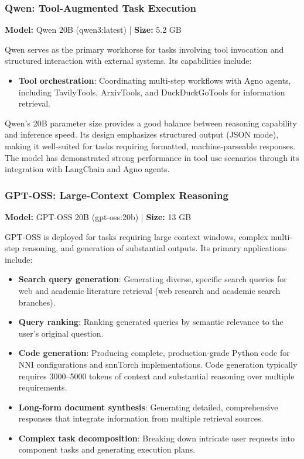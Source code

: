 \subsubsection{Qwen: Tool-Augmented Task Execution}

\textbf{Model:} Qwen 20B (qwen3:latest) | \textbf{Size:} 5.2 GB 

Qwen serves as the primary workhorse for tasks involving tool invocation and structured interaction with external systems. Its capabilities include:

\begin{itemize}
    
    \item \textbf{Tool orchestration}: Coordinating multi-step workflows with Agno agents, including TavilyTools, ArxivTools, and DuckDuckGoTools for information retrieval.
    
\end{itemize}

Qwen's 20B parameter size provides a good balance between reasoning capability and inference speed. Its design emphasizes structured output (JSON mode), making it well-suited for tasks requiring formatted, machine-parseable responses. The model has demonstrated strong performance in tool use scenarios through its integration with LangChain and Agno agents.

\subsubsection{GPT-OSS: Large-Context Complex Reasoning}

\textbf{Model:} GPT-OSS 20B (gpt-oss:20b) | \textbf{Size:} 13 GB 

GPT-OSS is deployed for tasks requiring large context windows, complex multi-step reasoning, and generation of substantial outputs. Its primary applications include:

\begin{itemize}
    \item \textbf{Search query generation}: Generating diverse, specific search queries for web and academic literature retrieval (web research and academic search branches).
        
    \item \textbf{Query ranking}: Ranking generated queries by semantic relevance to the user's original question.
    

    \item \textbf{Code generation}: Producing complete, production-grade Python code for NNI configurations and snnTorch implementations. Code generation typically requires 3000--5000 tokens of context and substantial reasoning over multiple requirements.
    
    \item \textbf{Long-form document synthesis}: Generating detailed, comprehensive responses that integrate information from multiple retrieval sources.
    
    \item \textbf{Complex task decomposition}: Breaking down intricate user requests into component tasks and generating execution plans.
\end{itemize}

